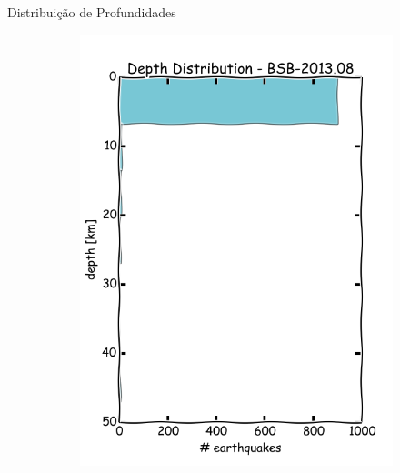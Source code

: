 \documentclass[ucs,8pt]{beamer}
\begin{document}
\begin{frame}{Distribuição de Profundidades}
\begin{figure}[H]
\begin{subfigure}[t]{0.4\textwidth}
			\includegraphics[width=1.00\textwidth]{dep_br_hist}
			\label{fig:br_dep_hist}
        \end{subfigure}%
  \label{fig:qc_histograms} 
\end{figure}
\end{frame}
\end{document}
